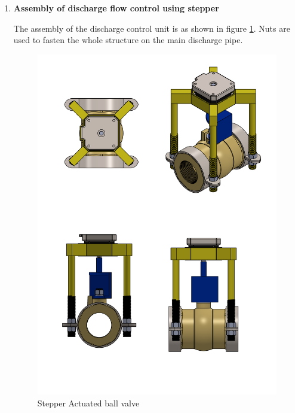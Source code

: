 \begin{enumerate}
\begin{enumerate}
    \item \textbf{Assembly of discharge flow control using stepper}
    \par
    The assembly of the discharge control unit is as shown in figure \ref{fig:stepper_actuated_ball_valve}. Nuts are used to fasten the whole structure on the main discharge pipe.
    
    \begin{figure}[H]
        \centering
        \includegraphics{Figures/ActuatedBallValve.PNG}
        \caption{Stepper Actuated ball valve}
        \label{fig:stepper_actuated_ball_valve}
    \end{figure}
    

\end{enumerate}
\end{enumerate}
